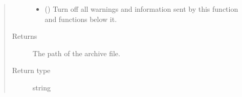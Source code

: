 \documentclass[letterpaper,10pt,english]{sphinxmanual}
\begin{document}
\begin{fulllineitems}
\begin{quote}
\begin{description}
\begin{itemize}
\item {} 
 (\sphinxstyleliteralemphasis{\sphinxupquote{ (}}\sphinxstyleliteralemphasis{\sphinxupquote{)}}) \textendash{} Turn off all warnings and information sent by this function
and functions below it.

\end{itemize}

\item[{Returns}] \leavevmode
{} \textendash{} The path of the archive file.

\item[{Return type}] \leavevmode
string

\end{description}\end{quote}

\end{fulllineitems}

\end{document}
